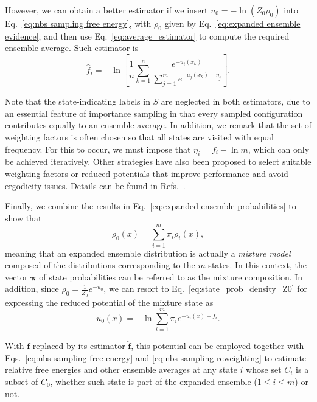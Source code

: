 \documentclass[aip,jcp,reprint,amsmath,amssymb]{revtex4-1}
\newcommand{\vt}[1]{\boldsymbol{\mathbf{#1}}}           %
\begin{document}
However, we can obtain a better estimator if we insert $u_0 = -\ln(Z_0\rho_0)$ into Eq.~\eqref{eq:nbs sampling free energy}, with $\rho_0$ given by Eq.~\eqref{eq:expanded ensemble evidence}, and then use Eq.~\eqref{eq:average_estimator} to compute the required ensemble average. Such estimator is
\begin{equation}
\label{eq:expanded ensemble FEP estimator}
\hat f_i = -\ln \left[ \frac{1}{n}\sum_{k=1}^n \frac{e^{-u_i(x_k)}}{\sum_{j=1}^m e^{-u_j(x_k) + \eta_j}} \right].
\end{equation}

Note that the state-indicating labels in $S$ are neglected in both estimators, due to an essential feature of importance sampling in that every sampled configuration contributes equally to an ensemble average. In addition, we remark that the set of weighting factors is often chosen so that all states are visited with equal frequency. For this to occur, we must impose that $\eta_i = f_i - \ln m$, which can only be achieved iteratively. Other strategies have also been proposed to select suitable weighting factors or reduced potentials that improve performance and avoid ergodicity issues. Details can be found in Refs.~.

Finally, we combine the results in Eq.~\eqref{eq:expanded ensemble probabilities} to show that
\begin{equation}
\label{eq:mixture ensemble}
\rho_0(x) = \sum_{i=1}^m \pi_i \rho_i(x),
\end{equation}
meaning that an expanded ensemble distribution is actually a \textit{mixture model}\cite{Lindsay_1995, Marin_2005} composed of the distributions corresponding to the $m$ states. In this context, the vector $\vt \pi$ of state probabilities can be referred to as the mixture composition. In addition, since $\rho_0 = \frac{1}{Z_0}e^{-u_0}$, we can resort to Eq.~\eqref{eq:state_prob_density_Z0} for expressing the reduced potential of the mixture state as
\begin{equation}
\label{eq:mixture potential}
u_0(x) = -\ln \sum_{i=1}^m \pi_i e^{-u_i(x) + f_i}.
\end{equation}

With $\vt f$ replaced by its estimator $\hat{\vt f}$, this potential can be employed together with Eqs.~\eqref{eq:nbs sampling free energy} and \eqref{eq:nbs sampling reweighting} to estimate relative free energies and other ensemble averages at any state $i$ whose set $C_i$ is a subset of $C_0$, whether such state is part of the expanded ensemble ($1 \le i \le m$) or not.
\end{document}
